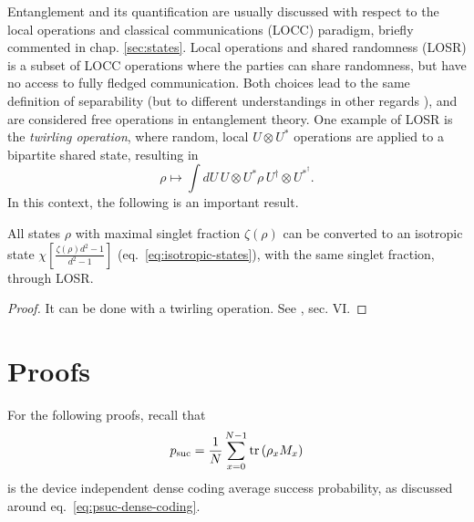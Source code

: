     Entanglement and its quantification are usually discussed with respect to the local operations and classical communications (LOCC) paradigm, briefly commented in chap. \ref{sec:states}. Local operations and shared randomness (LOSR) is a subset of LOCC operations where the parties can share randomness, but have no access to fully fledged communication. Both choices lead to the same definition of separability (but to different understandings in other regards \cite{schmid2021understanding}), and are considered free operations in entanglement theory. One example of LOSR is the \emph{twirling operation}, where random, local $U \otimes U^*$ operations are applied to a bipartite shared state, resulting in
    $$
        \rho \longmapsto \int dU\, U \otimes U^* \rho\, U^\dagger \otimes U^{*^\dagger} .
    $$
    In this context, the following is an important result. 

    \begin{lemma}
        All states $\rho$ with maximal singlet fraction $\zeta(\rho)$ can be converted to an isotropic state $\chi\left[ \frac{\zeta(\rho) d^2 - 1}{d^2 - 1} \right]$ (eq.~\eqref{eq:isotropic-states}), with the same singlet fraction, through LOSR.
        \label{lem:twirling}
    \end{lemma}
    \begin{proof}
        It can be done with a twirling operation. See \cite{horodecki_1999_isotropic}, sec. VI.
    \end{proof}


\section*{Proofs}

    For the following proofs, recall that
    \begin{equation*}
        p_{\text{suc}} = \frac{1}{N} \sum_{x=0}^{N-1} \text{tr}\left( \rho_x M_x \right)
    \end{equation*}
    is the device independent dense coding average success probability, as discussed around eq.~\eqref{eq:psuc-dense-coding}. 


